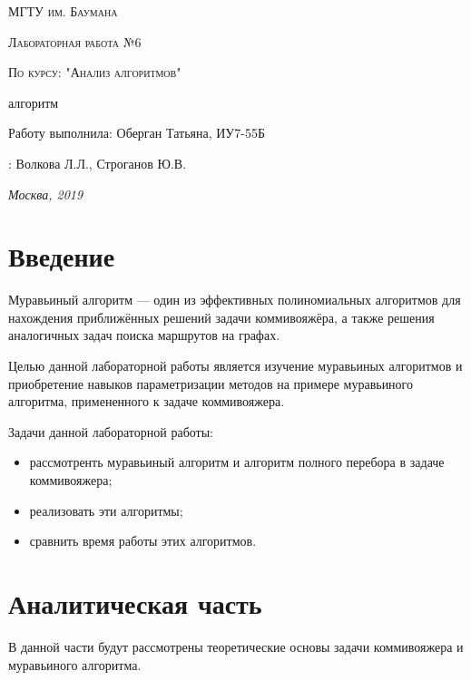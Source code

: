 \documentclass[12pt]{report}
\begin{document}
\begin{titlepage}
	\centering
	{\scshape\LARGE МГТУ им. Баумана \par}
	\vspace{3cm}
	{\scshape\Large Лабораторная работа №6\par}
	\vspace{0.5cm}	
	{\scshape\Large По курсу: "Анализ алгоритмов"\par}
	\vspace{1.5cm}
	{\huge{} алгоритм\par}
	\vspace{2cm}
	\Large Работу выполнила: Оберган Татьяна, ИУ7-55Б\par
	\vspace{0.5cm}
	:  Волкова Л.Л., Строганов Ю.В.\par

	\vfill
	\large \textit {Москва, 2019} \par
\end{titlepage}

\tableofcontents

\newpage
\chapter*{Введение}
Муравьиный алгоритм — один из эффективных полиномиальных алгоритмов для нахождения приближённых решений задачи коммивояжёра, а также решения аналогичных задач поиска маршрутов на графах.
        
Целью данной лабораторной работы является изучение муравьиных алгоритмов и приобретение навыков параметризации методов на примере муравьиного алгоритма, примененного к задаче коммивояжера.
        
Задачи данной лабораторной работы:
\begin{itemize}
	\item рассмотренть муравьиный алгоритм и алгоритм полного перебора в задаче коммивояжера;
	\item реализовать эти алгоритмы;
	\item сравнить время работы этих алгоритмов.
\end{itemize}



\chapter{Аналитическая часть}
В данной части будут рассмотрены теоретические основы задачи коммивояжера и муравьиного алгоритма. 
		
\end{document}
